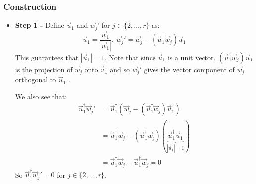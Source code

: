 \documentclass[../main.tex]{subfiles}
\begin{document}
\subsubsection{Construction}
\begin{itemize}
  \item \textbf{Step 1 -} Define $\vec{u}_1$ and $\vec{w}_j'$ for $j \in \{2, \ldots, r\}$ as:
    \[
      \vec{u}_1 = \frac{\vec{w}_1}{|\vec{w}_1|},\ \vec{w}_j' = \vec{w}_j  - (\vec{u}^{\dag}_{1}\vec{w}_j)\vec{u}_1
    \]
    This guarantees that $|\vec{u}_1| = 1$.
    Note that since $\vec{u}_1$ is a unit vector, $(\vec{u}^{\dag}_1 \vec{w}_j)\vec{u}_1$ is the projection of $\vec{w}_j$ onto $\vec{u}_1$ and so $\vec{w}_j'$ gives the vector component of $\vec{w}_j$ orthogonal to $\vec{u}_1$ .

     We also see that:
    \begin{align*}
      \vec{u}^{\dag}_{1}\vec{w}_j' &= \vec{u}^{\dag}_{1}(\vec{w}_j - (\vec{u}^{\dag}_{1}\vec{w}_j)\vec{u}_1) \\
                                   &= \vec{u}^{\dag}_{1}\vec{w}_j - (\vec{u}^{\dag}_{1}\vec{w}_j)(\underbrace{\vec{u}^{\dag}_{1}\vec{u}_1}_{|\vec{u}_1| = 1}) \\
                                   &= \vec{u}^{\dag}_{1}\vec{w}_j -\vec{u}^{\dag}_{1}\vec{w}_j = 0
    \end{align*}
    So $\vec{u}^{\dag}_{1}\vec{w}_j' = 0$ for $j \in \{2, \ldots, r\}$.


\end{itemize}
\end{document}
